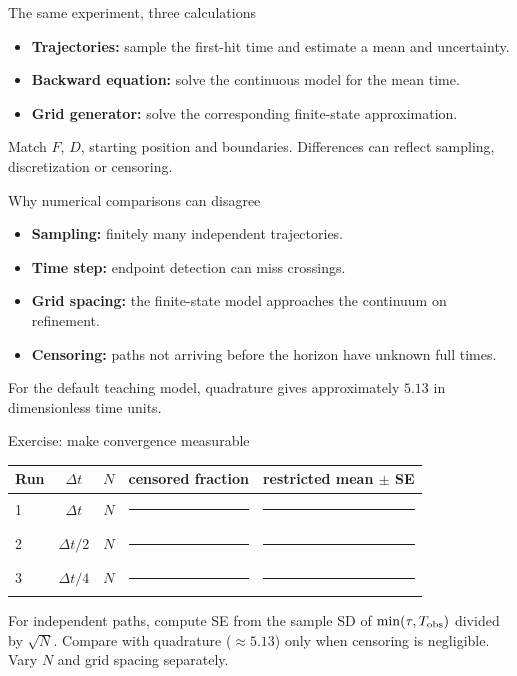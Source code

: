 \documentclass[aspectratio=169,10pt]{beamer}
\begin{document}
\begin{frame}{The same experiment, three calculations}
\begin{itemize}
\item \textbf{Trajectories:} sample the first-hit time and estimate a mean and uncertainty.
\item \textbf{Backward equation:} solve the continuous model for the mean time.
\item \textbf{Grid generator:} solve the corresponding finite-state approximation.
\end{itemize}
Match $F$, $D$, starting position and boundaries. Differences can reflect sampling, discretization or censoring.
\end{frame}

\begin{frame}{Why numerical comparisons can disagree}
\begin{itemize}\item \textbf{Sampling:} finitely many independent trajectories.\item \textbf{Time step:} endpoint detection can miss crossings.\item \textbf{Grid spacing:} the finite-state model approaches the continuum on refinement.\item \textbf{Censoring:} paths not arriving before the horizon have unknown full times.\end{itemize}
For the default teaching model, quadrature gives approximately $5.13$ in dimensionless time units.
\end{frame}

\begin{frame}{Exercise: make convergence measurable}
\small
\begin{center}
\begin{tabular}{lcccc}
\hline
Run & $\Delta t$ & $N$ & censored fraction & restricted mean $\pm$ SE\\
\hline
1 & $\Delta t$ & $N$ & \rule{1cm}{.1pt} & \rule{1.7cm}{.1pt}\\[3pt]
2 & $\Delta t/2$ & $N$ & \rule{1cm}{.1pt} & \rule{1.7cm}{.1pt}\\[3pt]
3 & $\Delta t/4$ & $N$ & \rule{1cm}{.1pt} & \rule{1.7cm}{.1pt}\\
\hline
\end{tabular}\end{center}
For independent paths, compute SE from the sample SD of $\min(\tau,T_{\rm obs})$ divided by $\sqrt N$. Compare with quadrature ($\approx5.13$) only when censoring is negligible. Vary $N$ and grid spacing separately.
\end{frame}
\end{document}
